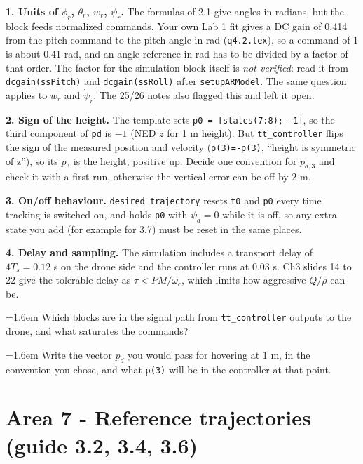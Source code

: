 \documentclass[10pt,a4paper]{article}
\newcommand{\cb}{\raisebox{-0.35ex}{\Large$\square$}}
\newcommand{\chk}[1]{\par\noindent\hangindent=1.6em\hangafter=1 \cb\hspace{0.6em}#1}
\begin{document}
\begin{warnbox}
\textbf{1. Units of $\phi_r$, $\theta_r$, $w_r$, $\dot\psi_r$.}
The formulas of 2.1 give angles in radians, but the block feeds normalized commands.
Your own Lab 1 fit gives a DC gain of 0.414 from the pitch command to the pitch angle in rad (\texttt{q4.2.tex}), so a command of 1 is about 0.41 rad, and an angle reference in rad has to be divided by a factor of that order.
The factor for the simulation block itself is \emph{not verified}: read it from \texttt{dcgain(ssPitch)} and \texttt{dcgain(ssRoll)} after \texttt{setupARModel}.
The same question applies to $w_r$ and $\dot\psi_r$.
The 25/26 notes also flagged this and left it open.
\par\smallskip\textbf{2. Sign of the height.}
The template sets \texttt{p0 = [states(7:8); -1]}, so the third component of \texttt{pd} is $-1$ (NED $z$ for 1 m height).
But \texttt{tt\_controller} flips the sign of the measured position and velocity (\texttt{p(3)=-p(3)}, ``height is symmetric of z''), so its $p_3$ is the height, positive up.
Decide one convention for $p_{d,3}$ and check it with a first run, otherwise the vertical error can be off by 2 m.
\par\smallskip\textbf{3. On/off behaviour.}
\texttt{desired\_trajectory} resets \texttt{t0} and \texttt{p0} every time tracking is switched on, and holds \texttt{p0} with $\psi_d=0$ while it is off, so any extra state you add (for example for 3.7) must be reset in the same places.
\par\smallskip\textbf{4. Delay and sampling.}
The simulation includes a transport delay of $4T_s=0.12$ s on the drone side and the controller runs at 0.03 s.
Ch3 slides 14 to 22 give the tolerable delay as $\tau<PM/\omega_c$, which limits how aggressive $Q/\rho$ can be.
\end{warnbox}

\begin{selfcheck}
\chk{Which blocks are in the signal path from \texttt{tt\_controller} outputs to the drone, and what saturates the commands?}
\chk{Write the vector $p_d$ you would pass for hovering at 1 m, in the convention you chose, and what \texttt{p(3)} will be in the controller at that point.}
\end{selfcheck}

\section*{Area 7 - Reference trajectories \hfill\normalfont\small (guide 3.2, 3.4, 3.6)}
\end{document}
